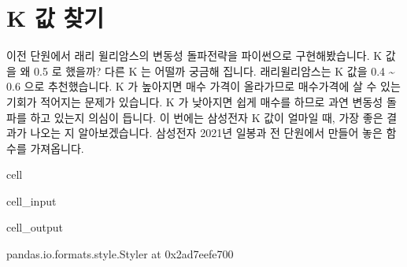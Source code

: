 \documentclass[letterpaper,10pt,english]{jupyterBook}
\begin{document}
\part{K 값 찾기}
\label{\detokenize{chapter2/2.4.1_Volatility_Breakout:k}}
\sphinxAtStartPar
이전 단원에서 래리 윌리암스의 변동성 돌파전략을 파이썬으로 구현해봤습니다. K 값을 왜 0.5 로 했을까? 다른 K 는 어떨까 궁금해 집니다. 래리윌리암스는 K 값을 0.4 \textasciitilde{} 0.6 으로 추천했습니다. K 가 높아지면 매수 가격이 올라가므로 매수가격에 살 수 있는 기회가 적어지는 문제가 있습니다. K 가 낮아지면 쉽게 매수를 하므로 과연 변동성 돌파를 하고 있는지 의심이 듭니다. 이 번에는 삼성전자 K 값이 얼마일 때, 가장 좋은 결과가 나오는 지 알아보겠습니다. 삼성전자 2021년 일봉과 전 단원에서 만들어 놓은 함수를 가져옵니다.

\begin{sphinxuseclass}{cell}\begin{sphinxVerbatimInput}

\begin{sphinxuseclass}{cell_input}
\begin{sphinxVerbatim}[commandchars=\\\{\}]
    

   
     
\end{sphinxVerbatim}

\end{sphinxuseclass}\end{sphinxVerbatimInput}
\begin{sphinxVerbatimOutput}

\begin{sphinxuseclass}{cell_output}
\begin{sphinxVerbatim}[commandchars=\\\{\}]
\PYGZlt{}pandas.io.formats.style.Styler at 0x2ad7eefe700\PYGZgt{}
\end{sphinxVerbatim}

\end{sphinxuseclass}\end{sphinxVerbatimOutput}

\end{sphinxuseclass}
\end{document}
